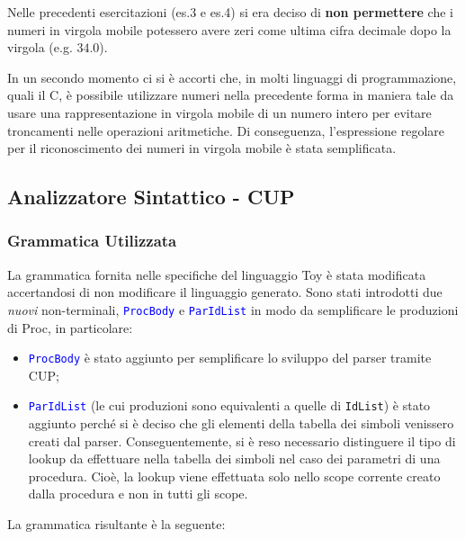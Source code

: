 \documentclass[a4paper,12pt]{article}
\begin{document}
   Nelle precedenti esercitazioni (es.3 e es.4) si era deciso di \textbf{non permettere} che i numeri in virgola mobile potessero 
   avere zeri come ultima cifra decimale dopo la virgola (e.g. $34.0$).

   In un secondo momento ci si è accorti che, in molti linguaggi di programmazione, quali il C, è possibile utilizzare 
   numeri nella precedente forma in maniera tale da usare una rappresentazione in virgola mobile di un numero intero 
   per evitare troncamenti nelle operazioni aritmetiche.
   Di conseguenza, l'espressione regolare per il riconoscimento dei numeri in virgola mobile è stata semplificata.

   \subsection{Analizzatore Sintattico - CUP}

	\subsubsection{Grammatica Utilizzata}
	La grammatica fornita nelle specifiche del linguaggio Toy è stata modificata accertandosi di non modificare il linguaggio generato.
	Sono stati introdotti due \emph{nuovi} non-terminali, \textcolor{blue}{\texttt{ProcBody}} e \textcolor{blue}{\texttt{ParIdList}}
	in modo da semplificare le produzioni di Proc, in particolare:
	
    \begin{itemize}
	\item \textcolor{blue}{\texttt{ProcBody}} è stato aggiunto per semplificare lo sviluppo del parser tramite CUP;
	\item \textcolor{blue}{\texttt{ParIdList}} (le cui produzioni sono equivalenti a quelle di \texttt{IdList}) è stato aggiunto perché si è  
		  deciso che gli elementi della tabella dei simboli venissero creati dal parser. Conseguentemente, si è reso necessario distinguere 
		  il tipo di lookup da effettuare nella tabella dei simboli nel caso dei parametri di una procedura. 
		  Cioè, la lookup viene effettuata solo nello scope corrente creato dalla procedura e non in tutti gli scope.
	\end{itemize}
	La grammatica risultante è la seguente:\newline
	
\end{document}
